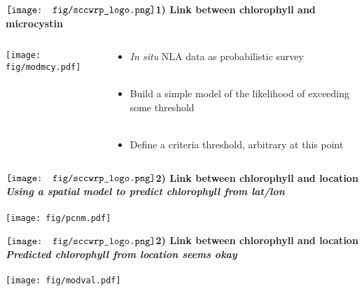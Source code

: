 \documentclass[serif]{beamer}\usepackage[]{graphicx}\usepackage[]{color}
\newcommand{\emtxt}[1]{\textbf{\textit{{\color{mypal4} #1}}}}
\begin{document}
\begin{frame}{{$\vcenter{\hbox{\texttt{[image: fig/sccwrp\_logo.png]}}}$\hspace{0.07in}\textbf{1) Link between chlorophyll and microcystin}}}
\begin{columns}
\begin{column}{0.6\textwidth}
\begin{center}
\texttt{[image: fig/modmcy.pdf]}
\end{center}
\end{column}
\begin{column}{0.4\textwidth}
\begin{itemize}
\item \textit{In situ} NLA data as probabilistic survey\\~\\
\item Build a simple model of the likelihood of exceeding some threshold \\~\\
\item Define a criteria threshold, arbitrary at this point
\end{itemize}
\end{column}
\end{columns}
\end{frame}





\begin{frame}{{$\vcenter{\hbox{\texttt{[image: fig/sccwrp\_logo.png]}}}$\hspace{0.07in}\textbf{2) Link between chlorophyll and location}}}
\centering
\emtxt{Using a spatial model to predict chlorophyll from lat/lon} \\~\\
\texttt{[image: fig/pcnm.pdf]}
\end{frame}



\begin{frame}{{$\vcenter{\hbox{\texttt{[image: fig/sccwrp\_logo.png]}}}$\hspace{0.07in}\textbf{2) Link between chlorophyll and location}}}
\centering
\emtxt{Predicted chlorophyll from location seems okay} \\~\\
\texttt{[image: fig/modval.pdf]}
\end{frame}
\end{document}
